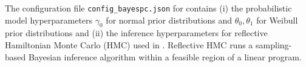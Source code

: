 The configuration file \texttt{config\_bayespc.json} for \BayesPC{} contains (i)
the probabilistic model hyperparameters $\gamma_0$ for normal prior
distributions and $\theta_0, \theta_1$ for Weibull prior distributions and (ii)
the inference hyperparameters for reflective Hamiltonian Monte Carlo (HMC) used
in \BayesPC{}.
%
Reflective HMC runs a sampling-based Bayesian inference algorithm within a
feasible region of a linear program.

